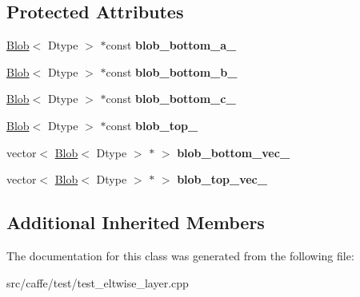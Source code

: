 \subsection*{Protected Attributes}
\begin{DoxyCompactItemize}
\item 
\mbox{\label{classcaffe_1_1_eltwise_layer_test_a0b8b12ac5968215db84ec25e78b0af0c}} 
\mbox{\hyperlink{classcaffe_1_1_blob}{Blob}}$<$ Dtype $>$ $\ast$const {\bfseries blob\+\_\+bottom\+\_\+a\+\_\+}
\item 
\mbox{\label{classcaffe_1_1_eltwise_layer_test_a0cb2460809f553222b20941dc6f3cb92}} 
\mbox{\hyperlink{classcaffe_1_1_blob}{Blob}}$<$ Dtype $>$ $\ast$const {\bfseries blob\+\_\+bottom\+\_\+b\+\_\+}
\item 
\mbox{\label{classcaffe_1_1_eltwise_layer_test_a95e24905ac859bf32ec52b023ea220c9}} 
\mbox{\hyperlink{classcaffe_1_1_blob}{Blob}}$<$ Dtype $>$ $\ast$const {\bfseries blob\+\_\+bottom\+\_\+c\+\_\+}
\item 
\mbox{\label{classcaffe_1_1_eltwise_layer_test_aab88d1b01663b6c2c375dd8cc1a8f9c2}} 
\mbox{\hyperlink{classcaffe_1_1_blob}{Blob}}$<$ Dtype $>$ $\ast$const {\bfseries blob\+\_\+top\+\_\+}
\item 
\mbox{\label{classcaffe_1_1_eltwise_layer_test_a47788984416231226685565d5050caec}} 
vector$<$ \mbox{\hyperlink{classcaffe_1_1_blob}{Blob}}$<$ Dtype $>$ $\ast$ $>$ {\bfseries blob\+\_\+bottom\+\_\+vec\+\_\+}
\item 
\mbox{\label{classcaffe_1_1_eltwise_layer_test_a518bf0f8562ec21d46d7013ac4977260}} 
vector$<$ \mbox{\hyperlink{classcaffe_1_1_blob}{Blob}}$<$ Dtype $>$ $\ast$ $>$ {\bfseries blob\+\_\+top\+\_\+vec\+\_\+}
\end{DoxyCompactItemize}
\subsection*{Additional Inherited Members}


The documentation for this class was generated from the following file\+:\begin{DoxyCompactItemize}
\item 
src/caffe/test/test\+\_\+eltwise\+\_\+layer.\+cpp\end{DoxyCompactItemize}
